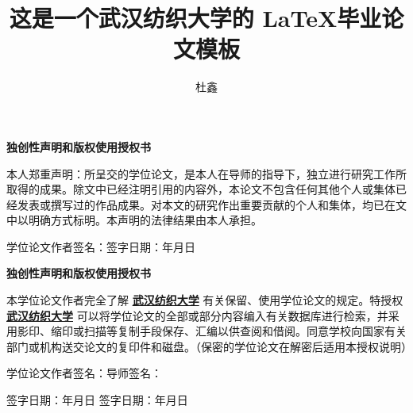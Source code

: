 \documentclass[]{WTUthesis}
\title{这是一个武汉纺织大学的 \LaTeX 毕业论文模板}
\author{杜鑫}
\begin{document}
	
	\maketitle
	
	\cleardoublepage
	
	\maketitletwo
	
	\newpage
	\thispagestyle{empty}
	
	\begin{center}
		\fontsize{14pt}{17.5pt}\selectfont\kaishu\bfseries 独创性声明和版权使用授权书
	\end{center}
	
	{
	\fontsize{12pt}{15pt}\selectfont\kaishu
	本人郑重声明：所呈交的学位论文，是本人在导师的指导下，独立进行研究工作所取得的成果。除文中已经注明引用的内容外，本论文不包含任何其他个人或集体已经发表或撰写过的作品成果。对本文的研究作出重要贡献的个人和集体，均已在文中以明确方式标明。本声明的法律结果由本人承担。
	}
	
	\vspace{4em}
	
	学位论文作者签名：\hfill 签字日期：\quad\quad 年\quad 月\quad 日
	
	\vspace{18em}
	
	\begin{center}
		\fontsize{14pt}{17.5pt}\selectfont\kaishu\bfseries 独创性声明和版权使用授权书
	\end{center}
	
	{
	\fontsize{12pt}{15pt}\selectfont\kaishu
	本学位论文作者完全了解 \underline{\textbf{武汉纺织大学}} 有关保留、使用学位论文的规定。特授权 \underline{\textbf{武汉纺织大学}} 可以将学位论文的全部或部分内容编入有关数据库进行检索，并采用影印、缩印或扫描等复制手段保存、汇编以供查阅和借阅。同意学校向国家有关部门或机构送交论文的复印件和磁盘。（保密的学位论文在解密后适用本授权说明）
	}
	
	\vspace{4em}
	
	学位论文作者签名：\hfill 导师签名：\makebox{\hspace{7em}}

	签字日期：\quad\quad 年\quad 月\quad 日 \hfill 签字日期：\quad\quad 年\quad 月\quad 日
	
	\cleardoublepage
	\makeabstract
	
\end{document}
